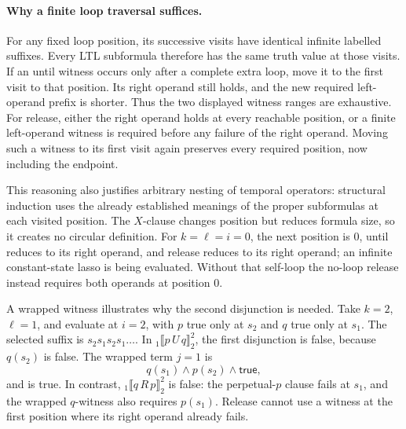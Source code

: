 \paragraph{Why a finite loop traversal suffices.}
For any fixed loop position, its successive visits have identical infinite
labelled suffixes. Every LTL subformula therefore has the same truth value at
those visits. If an until witness occurs only after a complete extra loop,
move it to the first visit to that position. Its right operand still holds,
and the new required left-operand prefix is shorter. Thus the two displayed
witness ranges are exhaustive. For release, either the right operand holds
at every reachable position, or a finite left-operand witness is required
before any failure of the right operand. Moving such a witness to its first
visit again preserves every required position, now including the endpoint.

This reasoning also justifies arbitrary nesting of temporal operators:
structural induction uses the already established meanings of the proper
subformulas at each visited position. The \(X\)-clause changes position but
reduces formula size, so it creates no circular definition.
For \(k=\ell=i=0\), the next position is \(0\), until reduces to its right
operand, and release reduces to its right operand; an infinite constant-state
lasso is being evaluated. Without that self-loop the no-loop release instead
requires both operands at position \(0\).

A wrapped witness illustrates why the second disjunction is needed. Take
\(k=2\), \(\ell=1\), and evaluate at \(i=2\), with \(p\) true only at
\(s_2\) and \(q\) true only at \(s_1\). The selected suffix is
\(s_2s_1s_2s_1\ldots\). In
\({}_1\llbracket p\,U\,q\rrbracket_2^2\), the first disjunction is false,
because \(q(s_2)\) is false. The wrapped term \(j=1\) is
\[
 q(s_1)\land p(s_2)\land\mathsf{true},
\]
and is true. In contrast,
\({}_1\llbracket q\,R\,p\rrbracket_2^2\) is false: the perpetual-\(p\) clause
fails at \(s_1\), and the wrapped \(q\)-witness also requires \(p(s_1)\).
Release cannot use a witness at the first position where its right operand
already fails.

